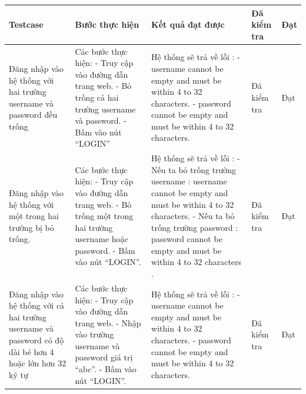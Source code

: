 \documentclass{article}
\begin{document}
\begin{longtable}{ | p{} |p{} | p{}  | p{}  | p{}  | } 
\hline
\textbf{Testcase}& \textbf{Bước thực hiện}& \textbf{Kết quả đạt được} & \textbf{Đã kiểm tra}& \textbf{Đạt} \\ 
\hline
\hline
Đăng nhập vào hệ thống với hai trường username và password đều trống &
Các bước thực hiện: \newline
- Truy cập vào đường dẫn trang web. \newline
- Bỏ trống cả hai trường username và password. \newline
- Bấm vào nút “LOGIN”
&
Hệ thống sẽ trả về lỗi : \newline
- username cannot be empty and must be within 4 to 32 characters. \newline
- password cannot be empty and must be within 4 to 32 characters.
&
Đã kiểm tra &
Đạt \\

\hline
Đăng nhập vào hệ thống với một trong hai trường bị bỏ trống. &
Các bước thực hiện: \newline
- Truy cập vào đường dẫn trang web. \newline
- Bỏ trống một trong hai trường username hoặc password.  \newline
- Bấm vào nút “LOGIN”. 
&
Hệ thống sẽ trả về lỗi : \newline
- Nếu ta bỏ trống trường username : username cannot be empty and must be within 4 to 32 characters. \newline
- Nếu ta bỏ trống trường password : password cannot be empty and must be within 4 to 32 characters . \newline
&
Đã kiểm tra &
Đạt \\

\hline
Đăng nhập vào hệ thống với cả hai trường username và password có độ dài bé hơn 4 hoặc lớn hơn 32 ký tự &
Các bước thực hiện: \newline
- Truy cập vào đường dẫn trang web. \newline
- Nhập vào trường username và password giá trị “abc”.  \newline
- Bấm vào nút “LOGIN”.
&
Hệ thống sẽ trả về lỗi : \newline
- username cannot be empty and must be within 4 to 32 characters. \newline
- password cannot be empty and must be within 4 to 32 characters. \newline
&
Đã kiểm tra &
Đạt \\


\end{longtable}
\end{document}
